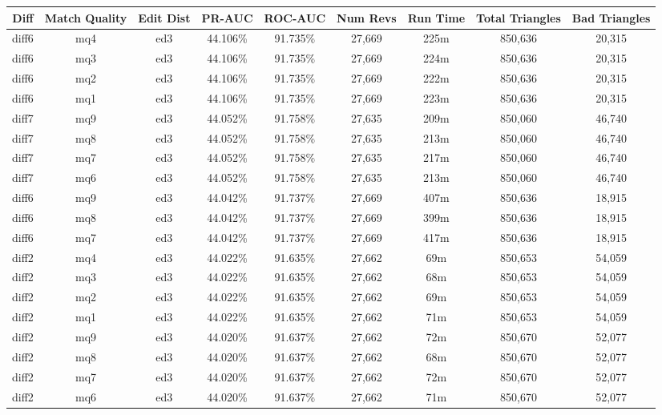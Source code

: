 \begin{sidewaystable}[!ph]
  \begin{center}
    \begin{tabular}{|c|c|c||c|c||c|c|c|c|}
\hline
Diff & Match Quality & Edit Dist
        & PR-AUC & ROC-AUC
        & Num Revs & Run Time
        & Total Triangles & Bad Triangles \\
\hline
\hline
diff6 & mq4 & ed3 & 44.106\% & 91.735\% & 27,669 & 225m & 850,636 & 20,315 \\
diff6 & mq3 & ed3 & 44.106\% & 91.735\% & 27,669 & 224m & 850,636 & 20,315 \\
diff6 & mq2 & ed3 & 44.106\% & 91.735\% & 27,669 & 222m & 850,636 & 20,315 \\
diff6 & mq1 & ed3 & 44.106\% & 91.735\% & 27,669 & 223m & 850,636 & 20,315 \\
diff7 & mq9 & ed3 & 44.052\% & 91.758\% & 27,635 & 209m & 850,060 & 46,740 \\
diff7 & mq8 & ed3 & 44.052\% & 91.758\% & 27,635 & 213m & 850,060 & 46,740 \\
diff7 & mq7 & ed3 & 44.052\% & 91.758\% & 27,635 & 217m & 850,060 & 46,740 \\
diff7 & mq6 & ed3 & 44.052\% & 91.758\% & 27,635 & 213m & 850,060 & 46,740 \\
diff6 & mq9 & ed3 & 44.042\% & 91.737\% & 27,669 & 407m & 850,636 & 18,915 \\
diff6 & mq8 & ed3 & 44.042\% & 91.737\% & 27,669 & 399m & 850,636 & 18,915 \\
diff6 & mq7 & ed3 & 44.042\% & 91.737\% & 27,669 & 417m & 850,636 & 18,915 \\
diff2 & mq4 & ed3 & 44.022\% & 91.635\% & 27,662 & 69m & 850,653 & 54,059 \\
diff2 & mq3 & ed3 & 44.022\% & 91.635\% & 27,662 & 68m & 850,653 & 54,059 \\
diff2 & mq2 & ed3 & 44.022\% & 91.635\% & 27,662 & 69m & 850,653 & 54,059 \\
diff2 & mq1 & ed3 & 44.022\% & 91.635\% & 27,662 & 71m & 850,653 & 54,059 \\
diff2 & mq9 & ed3 & 44.020\% & 91.637\% & 27,662 & 72m & 850,670 & 52,077 \\
diff2 & mq8 & ed3 & 44.020\% & 91.637\% & 27,662 & 68m & 850,670 & 52,077 \\
diff2 & mq7 & ed3 & 44.020\% & 91.637\% & 27,662 & 72m & 850,670 & 52,077 \\
diff2 & mq6 & ed3 & 44.020\% & 91.637\% & 27,662 & 71m & 850,670 & 52,077 \\

\end{tabular}
\end{center}
\end{sidewaystable}
